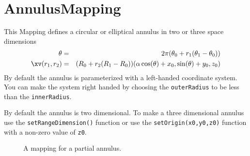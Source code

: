 \section{AnnulusMapping}


This Mapping defines a circular or elliptical annulus in two or three space dimensions
\begin{eqnarray*}
\theta &=&  2\pi( \theta_0 + r_1( \theta_1-\theta_0) ) \\
\xv(r_1,r_2) &=& (R_0 + r_2 (R_1-R_0)) ( \alpha \cos( \theta ) + x_0 , \sin(\theta) + y_0, z_0 )
\end{eqnarray*}
By default the annulus is parameterized with a left-handed coordinate system. You can 
make the system right handed by choosing the {\tt outerRadius} to be less than the
{\tt innerRadius}.

By default the annulus is two dimensional. To make a three dimensional annulus use the
{\tt setRangeDimension()} function or use the {\tt setOrigin(x0,y0,z0)} function with a
non-zero value of {\tt z0}.







\begin{figure}[hbt]
\newcommand{\figWidth}{10cm}
\newcommand{\trimfig}[2]{\trimFig{#1}{#2}{0.075}{.1}{.1}{.1}}
\begin{center}\small
 \caption{A mapping for a partial annulus.}
\label{fig:AnnulusMapping}
\end{center}
\end{figure}
